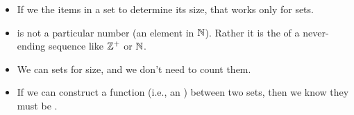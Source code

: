 \documentclass[../../../main.tex]{subfiles}
\begin{document}
\begin{itemize}

  \item If we  the items in a set to determine its size, that works only for  sets.
  
  \item {} is not a particular number (an element in $\Nats/$). Rather it is the  of a never-ending sequence like $\PositiveInts/$ or $\Nats/$.
  
  \item We can  sets for size, and we don't need to count them.
  
  \item If we can construct a  function (i.e., an ) between two sets, then we know they must be .

\end{itemize}
\end{document}
